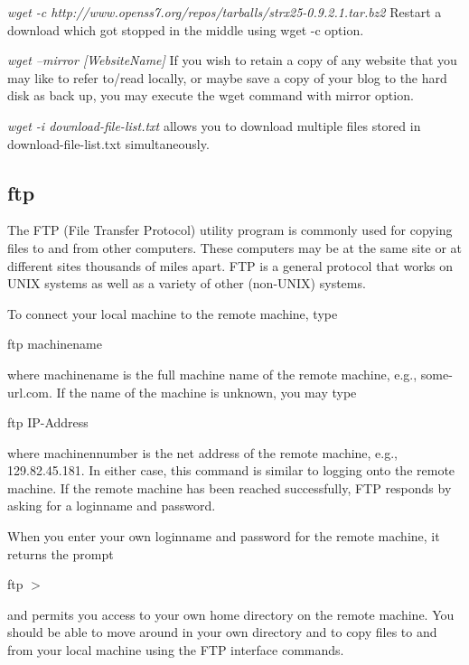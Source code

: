 \documentclass{article}
\begin{document}
\hspace{10mm} \textit {wget -c http://www.openss7.org/repos/tarballs/strx25-0.9.2.1.tar.bz2} Restart a download which got stopped in the middle using wget -c option.

\hspace{10mm} \textit{wget --mirror [WebsiteName]} If you wish to retain a copy of any website that you may like to refer to/read locally, or maybe save a copy of your blog to the hard disk as back up, you may execute the wget command with mirror option.

\hspace{10mm} \textit{wget -i download-file-list.txt} allows you to download multiple files stored in download-file-list.txt simultaneously.



\newpage

\subsection {ftp}

The FTP (File Transfer Protocol) utility program is commonly used for copying files to and from other computers. These computers may be at the same site or at different sites thousands of miles apart. FTP is a general protocol that works on UNIX systems as well as a variety of other (non-UNIX) systems.

To connect your local machine to the remote machine, type

\hspace{10mm} ftp machinename

where machinename is the full machine name of the remote machine, e.g., some-url.com. If the name of the machine is unknown, you may type

\hspace{10mm}ftp IP-Address

where machinennumber is the net address of the remote machine, e.g., 129.82.45.181. In either case, this command is similar to logging onto the remote machine. If the remote machine has been reached successfully, FTP responds by asking for a loginname and password.

When you enter your own loginname and password for the remote machine, it returns the prompt

\hspace{10mm}ftp $>$

and permits you access to your own home directory on the remote machine. You should be able to move around in your own directory and to copy files to and from your local machine using the FTP interface commands.
\end{document}
